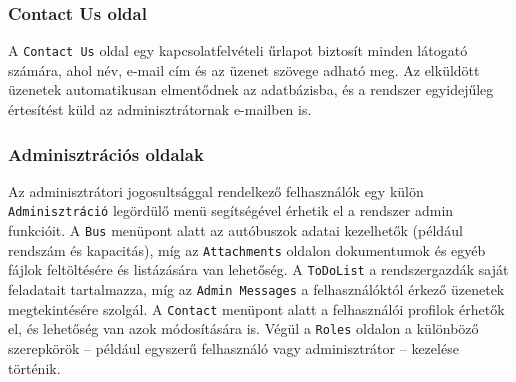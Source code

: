 \subsubsection{Contact Us oldal}

A \texttt{Contact Us} oldal egy kapcsolatfelvételi űrlapot biztosít minden látogató számára, ahol név, e-mail cím és az üzenet szövege adható meg. Az elküldött üzenetek automatikusan elmentődnek az adatbázisba, és a rendszer egyidejűleg értesítést küld az adminisztrátornak e-mailben is.

\subsubsection{Adminisztrációs oldalak}

Az adminisztrátori jogosultsággal rendelkező felhasználók egy külön \texttt{Adminisztráció} legördülő menü segítségével érhetik el a rendszer admin funkcióit. A \texttt{Bus} menüpont alatt az autóbuszok adatai kezelhetők (például rendszám és kapacitás), míg az \texttt{Attachments} oldalon dokumentumok és egyéb fájlok feltöltésére és listázására van lehetőség. A \texttt{ToDoList} a rendszergazdák saját feladatait tartalmazza, míg az \texttt{Admin Messages} a felhasználóktól érkező üzenetek megtekintésére szolgál. A \texttt{Contact} menüpont alatt a felhasználói profilok érhetők el, és lehetőség van azok módosítására is. Végül a \texttt{Roles} oldalon a különböző szerepkörök – például egyszerű felhasználó vagy adminisztrátor – kezelése történik.



